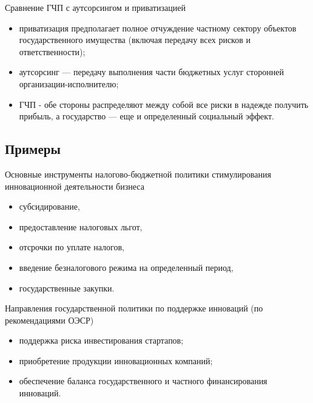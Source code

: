 \documentclass[_Venture_p3.tex]{subfiles}
\begin{document}
\begin{frame}[allowframebreaks]{Сравнение ГЧП с аутсорсингом и приватизацией}{}
\begin{itemize}
	\item приватизация предполагает полное отчуждение частному сектору объектов государственного имущества (включая передачу всех рисков и ответственности); 
	\item аутсорсинг — передачу выполнения части бюджетных услуг сторонней организации-исполнителю;

	\pagebreak
	\item ГЧП - обе стороны распределяют между собой все риски в надежде получить прибыль, а государство — еще и определенный социальный эффект.
\end{itemize}
\end{frame}

\subsection{Примеры}


\begin{frame}{Основные инструменты налогово-бюджетной политики  }{стимулирования инновационной деятельности бизнеса}
\begin{itemize}
	\item субсидирование, 
	\item предоставление налоговых льгот, 
	\item отсрочки по уплате налогов, 
	\item введение безналогового режима на определенный период, 
	\item государственные закупки.
\end{itemize}
\end{frame}



\begin{frame}{Направления государственной политики по поддержке инноваций }{(по рекомендациями ОЭСР)}
\begin{itemize}
	\item поддержка риска инвестирования стартапов;
	\item приобретение продукции инновационных компаний;
	\item обеспечение баланса государственного и частного финансирования инноваций.
\end{itemize}
\end{frame}

 
\end{document}
